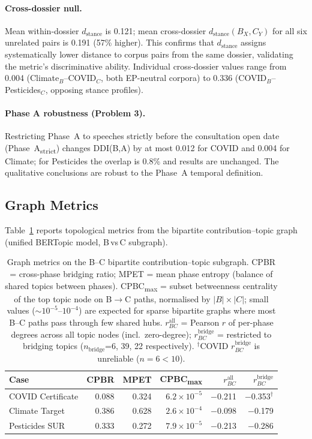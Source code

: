\documentclass[sigconf,natbib]{acmart}
\begin{document}
\paragraph{Cross-dossier null.}
Mean within-dossier $d_{\text{stance}}$ is 0.121; mean cross-dossier
$d_{\text{stance}}(B_X, C_Y)$ for all six unrelated pairs is 0.191 (57\% higher).
This confirms that $d_{\text{stance}}$ assigns systematically lower distance to
corpus pairs from the same dossier, validating the metric's discriminative ability.
Individual cross-dossier values range from 0.004 (Climate$_B$--COVID$_C$,
both EP-neutral corpora) to 0.336 (COVID$_B$--Pesticides$_C$, opposing stance profiles).

\paragraph{Phase A robustness (Problem 3).}
Restricting Phase~A to speeches strictly before the consultation open date
(Phase~A\textsubscript{strict}) changes DDI(B,A) by at most 0.012 for COVID
and 0.004 for Climate; for Pesticides the overlap is 0.8\% and results are unchanged.
The qualitative conclusions are robust to the Phase~A temporal definition.

\subsection{Graph Metrics}

Table~\ref{tab:graph} reports topological metrics from the bipartite contribution--topic
graph (unified BERTopic model, B\,vs\,C subgraph).

\begin{table}[t]
\centering
\small
\begin{tabular}{lrrrrr}
\toprule
\textbf{Case} & \textbf{CPBR} & \textbf{MPET} & \textbf{CPBC\textsubscript{max}} & $r_{BC}^{\text{all}}$ & $r_{BC}^{\text{bridge}}$ \\
\midrule
COVID Certificate & 0.088 & 0.324 & $6.2{\times}10^{-5}$ & $-$0.211 & $-$0.353$^\dagger$ \\
Climate Target    & 0.386 & 0.628 & $2.6{\times}10^{-4}$ & $-$0.098 & $-$0.179 \\
Pesticides SUR    & 0.333 & 0.272 & $7.9{\times}10^{-5}$ & $-$0.213 & $-$0.286 \\
\bottomrule
\end{tabular}
\caption{Graph metrics on the B--C bipartite contribution--topic subgraph.
CPBR = cross-phase bridging ratio; MPET = mean phase entropy (balance of shared topics between phases).
CPBC\textsubscript{max} = subset betweenness centrality of the top topic node on B$\to$C paths,
normalised by $|B|\times|C|$; small values ($\sim$$10^{-5}$--$10^{-4}$) are expected for sparse bipartite graphs
where most B--C paths pass through few shared hubs.
$r_{BC}^{\text{all}}$ = Pearson $r$ of per-phase degrees across all topic nodes (incl.\ zero-degree);
$r_{BC}^{\text{bridge}}$ = restricted to bridging topics ($n_{\text{bridge}}$=6, 39, 22 respectively).
$^\dagger$COVID $r_{BC}^{\text{bridge}}$ is unreliable ($n=6 < 10$).}
\label{tab:graph}
\end{table}
\end{document}
